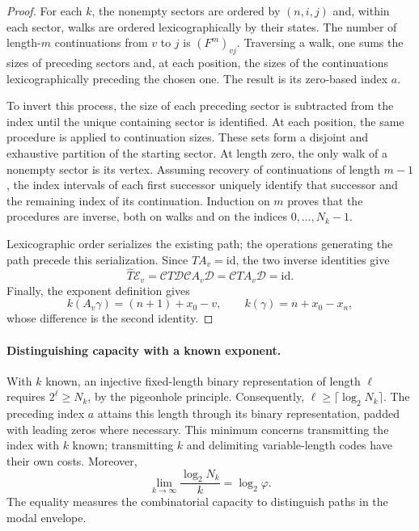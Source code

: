 \begin{proof}
For each \(k\), the nonempty sectors are ordered by \((n,i,j)\)
and, within each sector, walks are ordered lexicographically by
their states. The number of length-\(m\) continuations from
\(v\) to \(j\) is \((F^m)_{vj}\). Traversing a walk, one sums
the sizes of preceding sectors and, at each position, the sizes
of the continuations lexicographically preceding the chosen one.
The result is its zero-based index \(a\).

To invert this process, the size of each preceding sector is
subtracted from the index until the unique containing sector is
identified. At each position, the same procedure is applied
to continuation sizes. These sets form a disjoint and exhaustive
partition of the starting sector. At length zero, the only walk
of a nonempty sector is its vertex. Assuming recovery of
continuations of length \(m-1\), the index intervals of each first
successor uniquely identify that successor and the remaining
index of its continuation. Induction on \(m\) proves that the
procedures are inverse, both on walks and on the indices
\(0,\ldots,N_k-1\).

Lexicographic order serializes the existing path; the operations
generating the path precede this serialization.
Since \(T A_v=\mathrm{id}\), the two inverse identities give
\[
 \widehat T\mathcal E_v
 =\mathcal C T\mathcal D\mathcal C A_v\mathcal D
 =\mathcal C T A_v\mathcal D
 =\mathrm{id}.
\]
Finally, the exponent definition gives
\[
 k(A_v\gamma)=(n+1)+x_0-v,\qquad
 k(\gamma)=n+x_0-x_n,
\]
whose difference is the second identity.
\end{proof}

\paragraph{Distinguishing capacity with a known exponent.}
With \(k\) known, an injective fixed-length binary representation
of length \(\ell\) requires \(2^\ell\geq N_k\), by the
pigeonhole principle. Consequently,
\(\ell\geq\lceil\log_2N_k\rceil\).
The preceding index \(a\) attains this length through its binary
representation, padded with leading zeros where necessary.
This minimum concerns transmitting the index with \(k\) known;
transmitting \(k\) and delimiting variable-length codes have
their own costs. Moreover,
\[
 \lim_{k\to\infty}\frac{\log_2N_k}{k}=\log_2\varphi.
\]
The equality measures the combinatorial capacity to distinguish
paths in the modal envelope.

